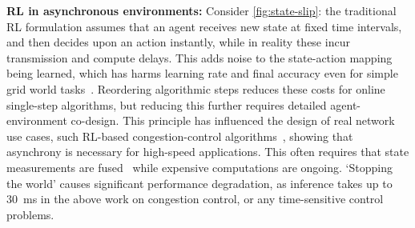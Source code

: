 \documentclass[
sigconf,natbib=false
]{acmart}
\newcommand{\fakepara}[1]{\noindent\textbf{#1:}}
\newcounter{insightc}
\newenvironment{insight}
	{
		\begin{tipblock}\refstepcounter{insightc}\textbf{Insight \theinsightc:}\em
	}
	{
		\end{tipblock}
	}
\begin{document}

\fakepara{RL in asynchronous environments}
Consider \cref{fig:state-slip}: the traditional RL formulation assumes that an agent receives new state at fixed time intervals, and then decides upon an action instantly, while in reality these incur transmission and compute delays.
This adds noise to the state-action mapping being learned, which has harms learning rate and final accuracy even for simple grid world tasks~\parencite{DBLP:journals/firai/TravnikMSP18}.
Reordering algorithmic steps reduces these costs for online single-step algorithms, but reducing this further requires detailed agent-environment co-design.
This principle has influenced the design of real network use cases, such RL-based congestion-control algorithms~\parencite{DBLP:journals/corr/abs-1910-04054}, showing that asynchrony is necessary for high-speed applications.
This often requires that state measurements are fused~\parencite{DBLP:journals/corr/abs-1910-04054,DBLP:journals/tnsm/SimpsonRP20} while expensive computations are ongoing.
`Stopping the world' causes significant performance degradation, as inference takes up to \SI{30}{\milli\second} in the above work on congestion control, or any time-sensitive control problems.
\end{document}
